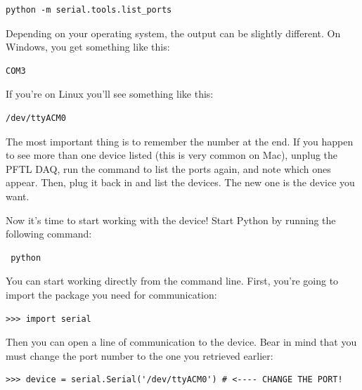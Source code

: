 \begin{verbatim}
python -m serial.tools.list_ports
\end{verbatim}


Depending on your operating system, the output can be slightly different. On Windows, you get something like this:

\begin{verbatim}
COM3
\end{verbatim}

If you're on Linux you'll see something like this:

\begin{verbatim}
/dev/ttyACM0
\end{verbatim}

The most important thing is to remember the number at the end. If you happen to see more than one device listed (this is very common on Mac), unplug the {PFTL DAQ}, run the command to list the ports again, and note which ones appear. Then, plug it back in and list the devices. The new one is the device you want.

Now it's time to start working with the device! Start Python by running the following command:

\begin{verbatim}
 python
\end{verbatim}

You can start working directly from the command line. First, you're going to import the package you need for communication:

\begin{verbatim}
>>> import serial
\end{verbatim}


Then you can open a line of communication to the device. Bear in mind that you must change the port number to the one you retrieved earlier:

\begin{verbatim}
>>> device = serial.Serial('/dev/ttyACM0') # <---- CHANGE THE PORT!
\end{verbatim}

